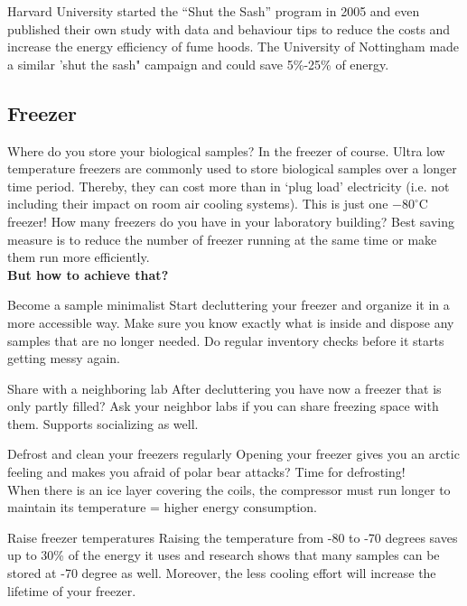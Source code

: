 Harvard University started the “Shut the Sash” program in 2005 and even published their own study with data and behaviour tips to reduce the costs and increase the energy efficiency of fume hoods.\cite{Harvard_sash}
The University of Nottingham made a similar 'shut the sash" campaign and could save 5\%-25\% of energy.
\cite{Nottingham_sash}


\subsection{Freezer}
Where do you store your biological samples? In the freezer of course. 
Ultra low temperature freezers are commonly used to store biological samples over a longer time period. Thereby, they can cost more than  in ‘plug load’ electricity (i.e. not including their impact on room air cooling systems). This is just one $-80^\circ \text{C}$ freezer!
How many freezers do you have in your laboratory building? 
Best saving measure is to reduce the number of freezer running at the same time or make them run more efficiently. \\

\textbf{But how to achieve that?  }

\begin{suggest}{Become a sample minimalist}
		Start decluttering your freezer and organize it in a more accessible way. Make sure you know exactly what is inside and dispose any samples that are no longer needed. Do regular inventory checks before it starts getting messy again. 
\end{suggest}

\begin{suggest}{Share with a neighboring lab}
	After decluttering you have now a freezer that is only partly filled? Ask your neighbor labs if you can share freezing space with them. Supports socializing as well.
\end{suggest}

\begin{suggest}{Defrost and clean your freezers regularly}
	Opening your freezer gives you an arctic feeling and makes you afraid of polar bear attacks? Time for defrosting!\\ 
	When there is an ice layer covering the coils, the compressor must run longer to maintain its temperature = higher energy consumption.
\end{suggest}

\begin{suggest}{Raise freezer temperatures}
	Raising the temperature from -80 to -70 degrees saves up to 30\% of the energy it uses and research shows that many samples can be stored at -70 degree as well. Moreover, the less cooling effort will increase the lifetime of your freezer. 
\end{suggest}

